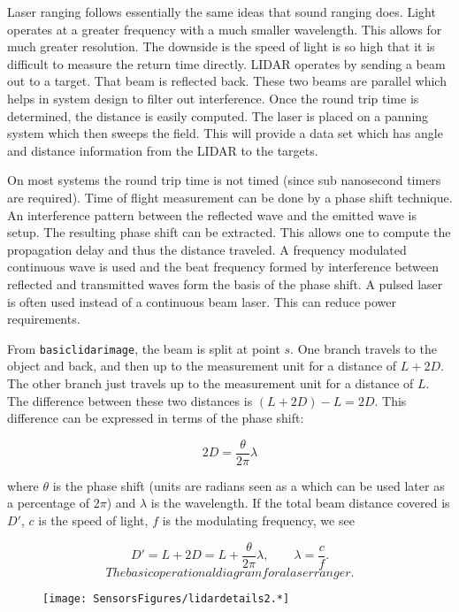Laser ranging follows essentially the same ideas that sound ranging
does. Light operates at a greater frequency with a much smaller
wavelength. This allows for much greater resolution. The downside is the
speed of light is so high that it is difficult to measure the return
time directly. LIDAR operates by sending a beam out to a target. That
beam is reflected back. These two beams are parallel which helps in
system design to filter out interference. Once the round trip time is
determined, the distance is easily computed. The laser is placed on a
panning system which then sweeps the field. This will provide a data set
which has angle and distance information from the LIDAR to the targets.

On most systems the round trip time is not timed (since sub nanosecond
timers are required). Time of flight measurement can be done by a phase
shift technique. An interference pattern between the reflected wave and
the emitted wave is setup. The resulting phase shift can be extracted.
This allows one to compute the propagation delay and thus the distance
traveled. A frequency modulated continuous wave is used and the beat
frequency formed by interference between reflected and transmitted waves
form the basis of the phase shift. A pulsed laser is often used instead
of a continuous beam laser. This can reduce power requirements.

From \texttt{basiclidarimage}, the beam is split at point \(s\). One
branch travels to the object and back, and then up to the measurement
unit for a distance of \(L+2D\). The other branch just travels up to the
measurement unit for a distance of \(L\). The difference between these
two distances is \((L+2D) - L = 2D\). This difference can be expressed
in terms of the phase shift:

\[2D =  \frac{\theta}{2\pi} \lambda\]

where \(\theta\) is the phase shift (units are radians seen as a which
can be used later as a percentage of \(2\pi\)) and \(\lambda\) is the
wavelength. If the total beam distance covered is \(D'\), \(c\) is the
speed of light, \(f\) is the modulating frequency, we see

\[D' = L + 2D =  L + \frac{\theta}{2\pi} \lambda ,\quad\quad
\lambda = \frac{c}{f}.\]\[The basic operational diagram for a laser ranger.\]

\begin{figure}
\centering
\texttt{[image: SensorsFigures/lidardetails2.*]}
\caption{}
\end{figure}


